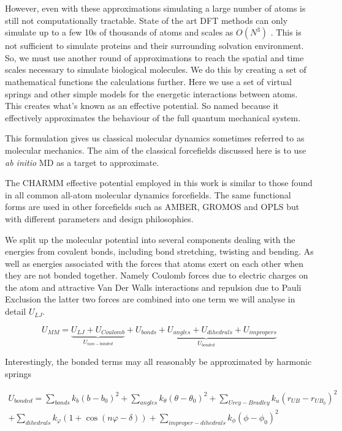 However, even with these approximations simulating a large number of atoms is still not computationally tractable. State of the art DFT methods can only simulate up to a few 10s of thousands of atoms \cite{luo2020} and scales as $O(N^3)$ \cite{kresse1996}. This is not sufficient to simulate proteins and their surrounding solvation environment. So, we must use another round of approximations to reach the spatial and time scales necessary to simulate biological molecules. We do this by creating a set of mathematical functions the calculations further. Here we use a set of virtual springs and other simple models for the energetic interactions between atoms. This creates what's known as an effective potential. So named because it effectively approximates the behaviour of the full quantum mechanical system.

This formulation gives us classical molecular dynamics sometimes referred to as molecular mechanics. The aim of the classical forcefields discussed here is to use \textit {ab initio} MD as a target to approximate. 

The CHARMM effective potential employed in this work is similar to those found in all common all-atom molecular dynamics forcefields. The same  functional forms are used in other forcefields such as AMBER, GROMOS and OPLS but with different parameters and design philosophies\cite{lemkul2020}. 

We split up the molecular potential into several components dealing with the energies from covalent bonds, including bond stretching, twisting and bending. As well as energies associated with the forces that atoms exert on each other when they are not bonded together. Namely Coulomb forces due to electric charges on the atom and attractive Van Der Walls interactions and repulsion due to Pauli Exclusion the latter two forces are combined into one term we will analyse in detail $U_{LJ}$.

\begin{equation}
	U_{MM} = \underbrace{U_{LJ} + U_{Coulomb}}_{U_{non-bonded}} + \underbrace{U_{bonds} + U_{angles} + U_{dihedrals} + U_{impropers}}_{U_{bonded} }
	\label{CHARMM_effective_potential_eq}
\end{equation}

Interestingly, the bonded terms may all reasonably be approximated by harmonic springs

\begin{equation}\label{bonded_eqs}
	\begin{aligned}
	U_{bonded} = \sum_{bonds} k_{b} (b-b_0)^2 + \sum_{angles} k_\theta(\theta-\theta_0)^2+ \sum_{Urey-Bradley} k_u(r_{UB}-r_{UB_0})^2   \\ + \sum_{dihedrals} k_\varphi (1+\cos(n \varphi - \delta)) + \sum_{improper-dihedrals}  k_{\phi} (\phi - \phi_0)^2 
\end{aligned}
\end{equation}

